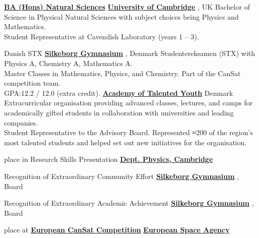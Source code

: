 \documentclass[
	a4paper,
	profilepicstyle=profilecircle,
]{fortysecondscv}
\newcommand{\cvsectionvspace}{\vspace{-0.5em}}
\newcommand{\cvsubsectionvspace}{\vspace{-1.0em}}
\newcommand{\linknoicon}[2]{%
	{\href{#1}{\textcolor{maincolor!70}{\textbf{#2}}}}%
}
\begin{document}
\cvsectionvspace
{}
\cvsubsectionvspace
\begin{cvtable}[1.6]
	{\linknoicon{https://www.undergraduate.study.cam.ac.uk/courses/natural-sciences}{BA (Hons) Natural Sciences}}
	{\linknoicon{https://www.cam.ac.uk/}{University of Cambridge}, UK}
	{
		Bachelor of Science in Physical Natural Sciences with subject choices being Physics and Mathematics.\\
		Student Representative at Cavendish Laboratory (years 1 -- 3).
	}
\end{cvtable}

\cvsubsectionvspace
\begin{cvtable}[1.6]
	{Danish STX}
	{\linknoicon{https://www.gymnasiet.dk/}{Silkeborg Gymnasium}, Denmark}
	{
		Studentereksamen (STX) with Physics A, Chemistry A, Mathematics A.\\
		Master Classes in Mathematics, Physics, and Chemistry. Part of the CanSat competition team.\\
		GPA:\@ 12.2 / 12.0 (extra credit).
	}
	{\linknoicon{https://talentfuldeunge.dk/}{Academy of Talented Youth}}
	{Denmark}
	{
		Extracurricular organisation providing advanced classes, lectures,
		and camps for academically gifted students in collaboration with universities
		and leading companies.\\
		Student Representative to the Advisory Board.
		Represented ≈200 of the region's most talented students and helped set out new initiatives
		for the organisation.
	}
\end{cvtable}

\newpage
\makebacksidebar

\cvsectionvspace
\begin{cvtable}[1.6]
	{ place in Research Skills Presentation}
	{\linknoicon{https://www.phy.cam.ac.uk/}{Dept. Physics, Cambridge}}
	{}

	{Recognition of Extraordinary Community Effort}
	{\linknoicon{https://www.gymnasiet.dk/}{Silkeborg Gymnasium}, Board}
	{}

	{Recognition of Extraordinary Academic Achievement}
	{\linknoicon{https://www.gymnasiet.dk/}{Silkeborg Gymnasium}, Board}
	{}

	{ place at \linknoicon{https://www.esa.int/Education/CanSat}{European CanSat Competition}}
	{\linknoicon{https://www.esa.int/}{European Space Agency}}
	{}
\end{cvtable}
\end{document}
